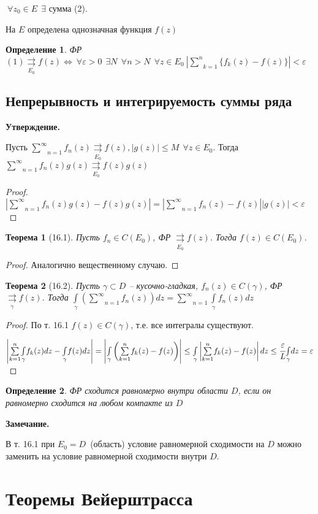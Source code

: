 \documentclass[draft]{report}
\newcommand{\rra}{\rightrightarrows}
\newcommand{\rrae}[1]{\underset{#1}{\rightrightarrows}}
\newcommand{\mint}[2]{\underset{#1}{\overset{#2}{\int}}}
\newcommand{\msum}[2]{\underset{#1}{\overset{#2}{\sum}}}
\newcommand{\LRA}{\Leftrightarrow}
\newcommand{\g}{\gamma}
\newcommand{\e}{\varepsilon}
\newcommand{\E}{\ \exists}
\newcommand{\F}{\ \forall}
\newcommand{\opr}[1]{\begin{opred}#1\end{opred}}
\newtheorem*{theor}{Теорема}
\newtheorem*{opred}{Определение}
\theoremstyle{remark}
\begin{document}
$\F z_0\in E\ \E$ сумма (2).

На $E$ определена однозначная функция $f(z)$

\opr{ФР $(1)\underset{E_0}{\rra}f(z)\LRA \F \e>0\ \E N\ \F n>N\ \F z\in E_0\ \left|\msum{k=1}{n}\{f_k(z)-f(z)\}\right|<\e$}

\subsection{Непрерывность и интегрируемость суммы ряда}

{\bfseries Утверждение.}

Пусть $\msum{n=1}{\infty}f_n(z)\rrae{E_0}f(z), |g(z)|\leq M\ \F z\in E_0$. Тогда $\msum{n=1}{\infty}f_n(z)g(z)\rrae{E_0}f(z)g(z)$
\begin{proof}
$|\msum{n=1}{\infty}f_n(z)g(z)-f(z)g(z)|=|\msum{n=1}{\infty}f_n(z)-f(z)||g(z)|<\e$
\end{proof}

\begin{theor}[16.1]
Пусть $f_n\in C(E_0)$, ФР $\rrae{E_0}f(z)$. Тогда $f(z)\in C(E_0)$.
\end{theor}
\begin{proof}
Аналогично вещественному случаю.
\end{proof}

\begin{theor}[16.2]
Пусть $\g\subset D$ -- кусочно-гладкая, $f_n(z)\in C(\g)$, ФР$\rrae{\g}f(z)$. Тогда $\mint{\g}{}\left(\msum{n=1}{\infty}f_n(z)\right)dz=\msum{n=1}{\infty}\mint{\g}{}f_n(z)dz$
\end{theor}
\begin{proof}
По т. 16.1 $f(z)\in C(\g)$, т.е. все интегралы существуют.

$\left|\msum{k=1}{n}\mint{\g}{}f_k(z)dz-\mint{\g}{}f(z)dz\right|=\left|\mint{\g}{}\left(\msum{k=1}{n}f_k(z)-f(z)\right)\right|\leq\mint{\g}{}\left|\msum{k=1}{n}f_k(z)-f(z)\right|dz\leq\cfrac \e L\mint{\g}{}dz=\e$
\end{proof}

\opr{ФР сходится равномерно внутри области $D$, если он равномерно сходится на любом компакте из $D$}

{\bfseries Замечание.}

В т. 16.1 при $E_0=D$~(область) условие равномерной сходимости на $D$ можно заменить на условие равномерной сходимости внутри $D$.

\section{Теоремы Вейерштрасса}
\end{document}
